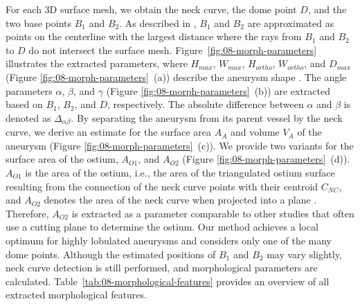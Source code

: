 \documentclass[
  oneside]{book}
\begin{document}
For each 3D surface mesh, we obtain the neck curve, the dome point \(D\), and the two base points \(B_1\) and \(B_2\).
As described in \autocite{Saalfeld2018}, \(B_1\) and \(B_2\) are approximated as points on the centerline with the largest distance where the rays from \(B_1\) and \(B_2\) to \(D\) do not intersect the surface mesh.
Figure~\ref{fig:08-morph-parameters} illustrates the extracted parameters, where \(H_{max}\), \(W_{max}\), \(H_{ortho}\), \(W_{ortho}\), and \(D_{max}\) (Figure \ref{fig:08-morph-parameters}~(a)) describe the aneurysm shape \autocite{Dhar2008,LauricEtAl:Neurosurgery2012}.
The angle parameters \(\alpha\), \(\beta\), and \(\gamma\) (Figure \ref{fig:08-morph-parameters}~(b)) are extracted based on \(B_1\), \(B_2\), and \(D\), respectively.
The absolute difference between \(\alpha\) and \(\beta\) is denoted as \(\Delta_{\alpha\beta}\).
By separating the aneurysm from its parent vessel by the neck curve, we derive an estimate for the surface area \(A_A\) and volume \(V_A\) of the aneurysm (Figure \ref{fig:08-morph-parameters}~(c)).
We provide two variants for the surface area of the ostium, \(A_{O1}\), and \(A_{O2}\) (Figure \ref{fig:08-morph-parameters}~(d)).
\(A_{O1}\) is the area of the ostium, i.e., the area of the triangulated ostium surface resulting from the connection of the neck curve points with their centroid \(C_{NC}\), and \(A_{O2}\) denotes the area of the neck curve when projected into a plane \autocite{Saalfeld2018}.
Therefore, \(A_{O2}\) is extracted as a parameter comparable to other studies that often use a cutting plane to determine the ostium.
Our method achieves a local optimum for highly lobulated aneurysms and considers only one of the many dome points.
Although the estimated positions of \(B_1\) and \(B_2\) may vary slightly, neck curve detection is still performed, and morphological parameters are calculated. Table~\ref{tab:08-morphological-features} provides an overview of all extracted morphological features.
\end{document}
